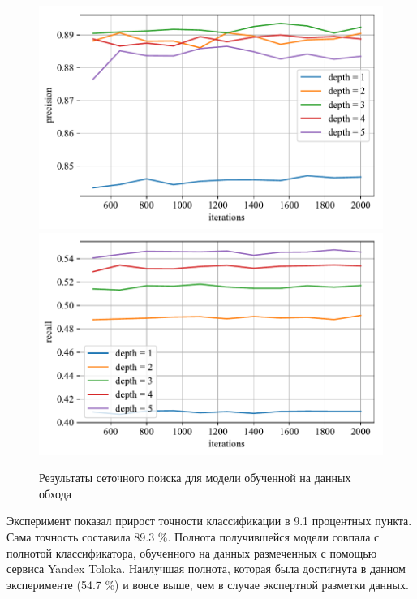 \begin{figure}
    \centering
    \includegraphics{../images/model_factory_precision.pdf}
    \includegraphics{../images/model_factory_recall.pdf}
    \caption{Результаты сеточного поиска для модели обученной на данных обхода}
    \label{fig:model_factory}
\end{figure}

Эксперимент показал прирост точности классификации в 9.1 процентных пункта. Сама точность составила 89.3 \%. Полнота получившейся модели совпала с полнотой классификатора, обученного на данных размеченных с помощью сервиса Yandex Toloka. Наилучшая полнота, которая была достигнута в данном эксперименте (54.7 \%) и вовсе выше, чем в случае экспертной разметки данных.